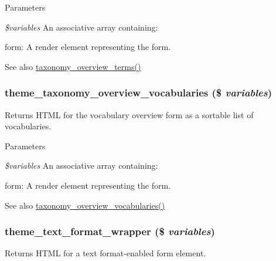 \begin{DoxyParams}{Parameters}
\item[{\em \$variables}]An associative array containing:
\begin{DoxyItemize}
\item form: A render element representing the form.
\end{DoxyItemize}\end{DoxyParams}
\begin{DoxySeeAlso}{See also}
\hyperlink{group__forms_gac5a4ddd2115e830118c10b98f464a4ab}{taxonomy\_\-overview\_\-terms()} 
\end{DoxySeeAlso}
\hypertarget{group__themeable_ga8037235a6d606e3f579783845327fdc0}{
\subsubsection[{theme\_\-taxonomy\_\-overview\_\-vocabularies}]{\setlength{\rightskip}{0pt plus 5cm}theme\_\-taxonomy\_\-overview\_\-vocabularies (\$ {\em variables})}}
\label{group__themeable_ga8037235a6d606e3f579783845327fdc0}
Returns HTML for the vocabulary overview form as a sortable list of vocabularies.


\begin{DoxyParams}{Parameters}
\item[{\em \$variables}]An associative array containing:
\begin{DoxyItemize}
\item form: A render element representing the form.
\end{DoxyItemize}\end{DoxyParams}
\begin{DoxySeeAlso}{See also}
\hyperlink{group__forms_ga4509184b09d51fc6f3cccbd883cbd4f8}{taxonomy\_\-overview\_\-vocabularies()} 
\end{DoxySeeAlso}
\hypertarget{group__themeable_gadfd0e06f1e78fbc4f260b84872e1911e}{
\subsubsection[{theme\_\-text\_\-format\_\-wrapper}]{\setlength{\rightskip}{0pt plus 5cm}theme\_\-text\_\-format\_\-wrapper (\$ {\em variables})}}
\label{group__themeable_gadfd0e06f1e78fbc4f260b84872e1911e}
Returns HTML for a text format-\/enabled form element.


